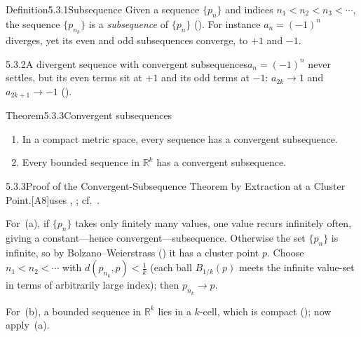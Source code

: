 \documentclass[main.tex]{subfiles}
\begin{document}

\begin{Obj}{Definition}{5.3.1}{Subsequence}
Given a sequence $\{p_n\}$ and indices $n_1<n_2<n_3<\cdots$, the sequence $\{p_{n_k}\}$ is a
\emph{subsequence} of $\{p_n\}$ (). For instance $a_n=(-1)^n$ diverges, yet its even and odd
subsequences converge, to $+1$ and $-1$.
\end{Obj}

\begin{Fig}{5.3.2}{A divergent sequence with convergent subsequences}{$a_n=(-1)^n$ never settles, but its even terms sit at $+1$ and its odd terms at $-1$: $a_{2k}\to1$ and $a_{2k+1}\to-1$ ().}
\end{Fig}

\begin{Obj}{Theorem}{5.3.3}{Convergent subsequences}
\begin{enumerate}
  \item In a compact metric space, every sequence has a convergent subsequence.
  \item Every bounded sequence in $\mathbb R^k$ has a convergent subsequence.
\end{enumerate}
\end{Obj}
\begin{Prf}{5.3.3}{Proof of the Convergent-Subsequence Theorem by Extraction at a Cluster Point.}{[A8]\quad uses , ; cf.\ .}
\item For~(a), if $\{p_n\}$ takes only finitely many values, one value recurs infinitely often,
  giving a constant---hence convergent---subsequence. Otherwise the set $\{p_n\}$ is infinite, so by
  Bolzano--Weierstrass () it has a cluster point $p$. Choose $n_1<n_2<\cdots$ with
  $d(p_{n_k},p)<\tfrac1k$ (each ball $B_{1/k}(p)$ meets the infinite value-set in terms of
  arbitrarily large index); then $p_{n_k}\to p$.
\item For~(b), a bounded sequence in $\mathbb R^k$ lies in a $k$-cell, which is compact
  (); now apply~(a).
\end{Prf}
\end{document}
